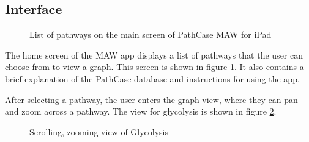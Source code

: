 \subsection{Interface}
\label{sect:interface}

\begin{figure}
    \caption{\label{fig:maw_screenshot_list} List of pathways on the main screen
    of PathCase MAW for iPad}
\end{figure}

The home screen of the MAW app displays a list of pathways that the user can
choose from to view a graph. This screen is shown in figure
\ref{fig:maw_screenshot_list}. It also contains a brief explanation of the
PathCase database and instructions for using the app.

After selecting a pathway, the user enters the graph view, where they can pan
and zoom across a pathway. The view for glycolysis is shown in figure
\ref{fig:maw_screenshot_pathway}.

\begin{figure}[hbt]
    \caption{\label{fig:maw_screenshot_pathway} Scrolling, zooming view of
    Glycolysis}
\end{figure}
